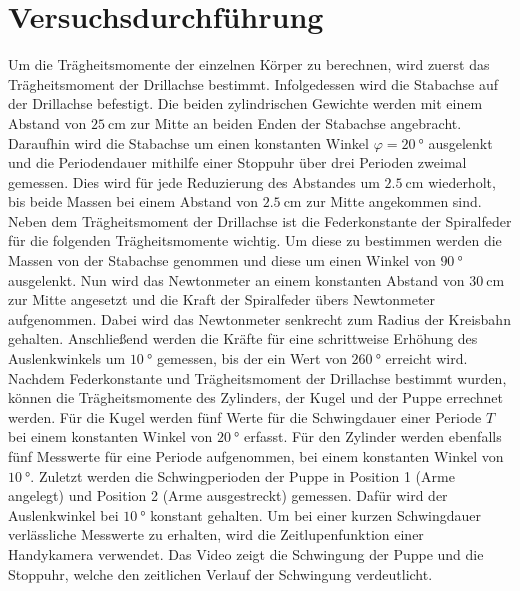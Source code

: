 \section{Versuchsdurchführung}\justifying

Um die Trägheitsmomente der einzelnen Körper zu berechnen, wird zuerst das Trägheitsmoment der Drillachse bestimmt. Infolgedessen wird die
Stabachse auf der Drillachse befestigt. Die beiden zylindrischen Gewichte werden mit einem Abstand von $\SI{25}{\centi\meter}$ zur Mitte an beiden 
Enden der Stabachse angebracht. Daraufhin wird die Stabachse um einen konstanten Winkel $\varphi = \SI{20}{\degree}$ ausgelenkt und die Periodendauer mithilfe
einer Stoppuhr über drei Perioden zweimal gemessen. Dies wird für jede Reduzierung des Abstandes um $\SI{2.5}{\centi\meter}$ wiederholt, bis beide 
Massen bei einem Abstand von $\SI{2.5}{\centi\meter}$ zur Mitte angekommen sind.\\
Neben dem Trägheitsmoment der Drillachse ist die Federkonstante der Spiralfeder für die folgenden Trägheitsmomente wichtig. Um diese zu bestimmen 
werden die Massen von der Stabachse genommen und diese um einen Winkel von $\SI{90}{\degree}$  ausgelenkt. Nun wird das Newtonmeter an einem konstanten Abstand von 
$\SI{30}{\centi\meter}$ zur Mitte angesetzt und die Kraft der Spiralfeder übers Newtonmeter aufgenommen. Dabei wird das Newtonmeter
senkrecht zum Radius der Kreisbahn gehalten. Anschließend werden die Kräfte für eine schrittweise Erhöhung des Auslenkwinkels um $\SI{10}{\degree}$ gemessen,
bis der ein Wert von $\SI{260}{\degree}$ erreicht wird.\\
Nachdem Federkonstante und Trägheitsmoment der Drillachse bestimmt wurden, können die Trägheitsmomente des Zylinders, der Kugel und der Puppe
errechnet werden. Für die Kugel werden fünf Werte für die Schwingdauer einer Periode $T$ bei einem konstanten Winkel von $\SI{20}{\degree}$ erfasst.
Für den Zylinder werden ebenfalls fünf Messwerte für eine Periode aufgenommen, bei einem konstanten Winkel von $\SI{10}{\degree}$. 
Zuletzt werden die Schwingperioden der Puppe in Position 1 (Arme angelegt) und Position 2 (Arme ausgestreckt) gemessen. Dafür wird der Auslenkwinkel
bei $\SI{10}{\degree}$ konstant gehalten. Um bei einer kurzen Schwingdauer verlässliche Messwerte zu erhalten, wird die Zeitlupenfunktion einer 
Handykamera verwendet. Das Video zeigt die Schwingung der Puppe und die Stoppuhr, welche den zeitlichen Verlauf der Schwingung verdeutlicht.

